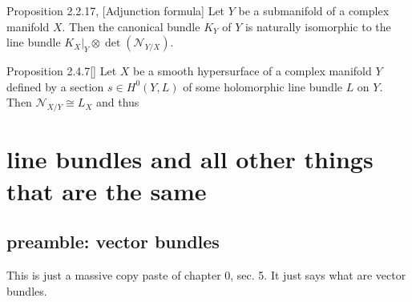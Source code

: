 \begin{thing4}{Proposition 2.2.17, \cite{huc}}[Adjunction formula]\label{prop:2.2.17}\leavevmode
Let \(Y\) be a submanifold of a complex manifold \(X\). Then the canonical bundle \(K_Y\) of \(Y\) is naturally isomorphic to the line bundle \(K_X|_{Y} \otimes \det(\mathcal{N}_{Y/X})\).
\end{thing4}

\begin{thing4}{Proposition 2.4.7}[\cite{huc}]\label{prop:2.4.7}\leavevmode
Let \(X\) be a smooth hypersurface of a complex manifold \(Y\) defined by a section \(s \in H^{0}(Y,L)\) of some holomorphic line bundle \(L\) on \(Y\). Then \(\mathcal{N}_{X/Y}\cong L_X\) and thus 
\end{thing4}

\section{line bundles and all other things that are the same}

\subsection{preamble: vector bundles}

This is just a massive copy paste of \cite{gri} chapter 0, sec. 5. It just says what are vector bundles.

